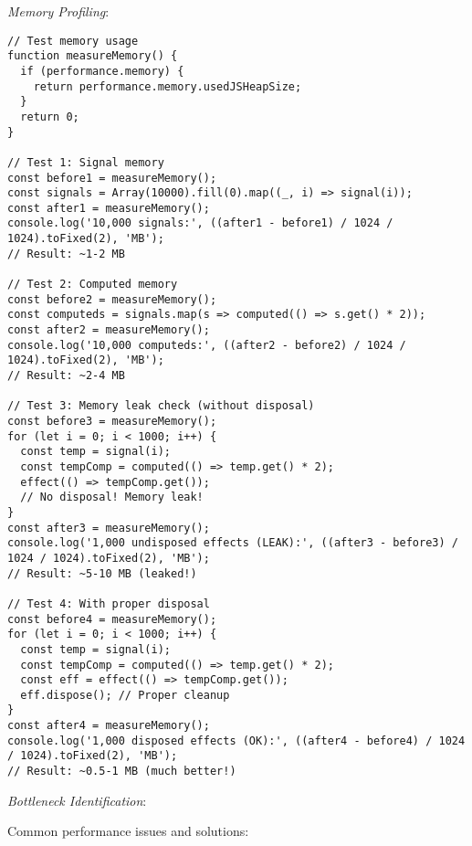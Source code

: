\documentclass[11pt]{article}
\begin{document}
\emph{Memory Profiling}:

\begin{verbatim}
// Test memory usage
function measureMemory() {
  if (performance.memory) {
    return performance.memory.usedJSHeapSize;
  }
  return 0;
}

// Test 1: Signal memory
const before1 = measureMemory();
const signals = Array(10000).fill(0).map((_, i) => signal(i));
const after1 = measureMemory();
console.log('10,000 signals:', ((after1 - before1) / 1024 / 1024).toFixed(2), 'MB');
// Result: ~1-2 MB

// Test 2: Computed memory
const before2 = measureMemory();
const computeds = signals.map(s => computed(() => s.get() * 2));
const after2 = measureMemory();
console.log('10,000 computeds:', ((after2 - before2) / 1024 / 1024).toFixed(2), 'MB');
// Result: ~2-4 MB

// Test 3: Memory leak check (without disposal)
const before3 = measureMemory();
for (let i = 0; i < 1000; i++) {
  const temp = signal(i);
  const tempComp = computed(() => temp.get() * 2);
  effect(() => tempComp.get());
  // No disposal! Memory leak!
}
const after3 = measureMemory();
console.log('1,000 undisposed effects (LEAK):', ((after3 - before3) / 1024 / 1024).toFixed(2), 'MB');
// Result: ~5-10 MB (leaked!)

// Test 4: With proper disposal
const before4 = measureMemory();
for (let i = 0; i < 1000; i++) {
  const temp = signal(i);
  const tempComp = computed(() => temp.get() * 2);
  const eff = effect(() => tempComp.get());
  eff.dispose(); // Proper cleanup
}
const after4 = measureMemory();
console.log('1,000 disposed effects (OK):', ((after4 - before4) / 1024 / 1024).toFixed(2), 'MB');
// Result: ~0.5-1 MB (much better!)
\end{verbatim}

\emph{Bottleneck Identification}:

Common performance issues and solutions:
\end{document}
